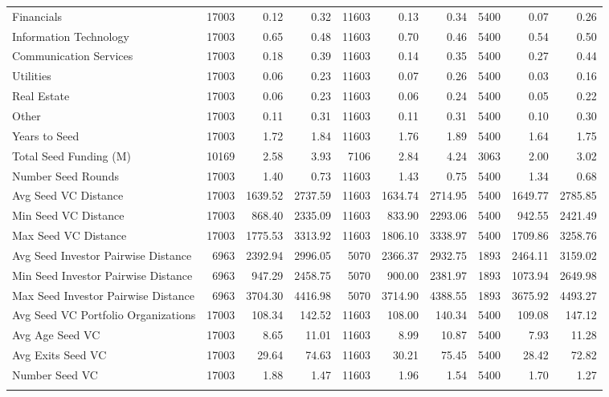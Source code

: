 {\begin{table}[!h]
{\begin{tabular}[t]{lrrrrrrrrr}
Financials & 17003 & 0.12 & 0.32 & 11603 & 0.13 & 0.34 & 5400 & 0.07 & 0.26\\
Information Technology & 17003 & 0.65 & 0.48 & 11603 & 0.70 & 0.46 & 5400 & 0.54 & 0.50\\
Communication Services & 17003 & 0.18 & 0.39 & 11603 & 0.14 & 0.35 & 5400 & 0.27 & 0.44\\
Utilities & 17003 & 0.06 & 0.23 & 11603 & 0.07 & 0.26 & 5400 & 0.03 & 0.16\\
\addlinespace
Real Estate & 17003 & 0.06 & 0.23 & 11603 & 0.06 & 0.24 & 5400 & 0.05 & 0.22\\
Other & 17003 & 0.11 & 0.31 & 11603 & 0.11 & 0.31 & 5400 & 0.10 & 0.30\\
Years to Seed & 17003 & 1.72 & 1.84 & 11603 & 1.76 & 1.89 & 5400 & 1.64 & 1.75\\
Total Seed Funding (M) & 10169 & 2.58 & 3.93 & 7106 & 2.84 & 4.24 & 3063 & 2.00 & 3.02\\
Number Seed Rounds & 17003 & 1.40 & 0.73 & 11603 & 1.43 & 0.75 & 5400 & 1.34 & 0.68\\
\addlinespace
Avg Seed VC Distance & 17003 & 1639.52 & 2737.59 & 11603 & 1634.74 & 2714.95 & 5400 & 1649.77 & 2785.85\\
Min Seed VC Distance & 17003 & 868.40 & 2335.09 & 11603 & 833.90 & 2293.06 & 5400 & 942.55 & 2421.49\\
Max Seed VC Distance & 17003 & 1775.53 & 3313.92 & 11603 & 1806.10 & 3338.97 & 5400 & 1709.86 & 3258.76\\
Avg Seed Investor Pairwise Distance & 6963 & 2392.94 & 2996.05 & 5070 & 2366.37 & 2932.75 & 1893 & 2464.11 & 3159.02\\
Min Seed Investor Pairwise Distance & 6963 & 947.29 & 2458.75 & 5070 & 900.00 & 2381.97 & 1893 & 1073.94 & 2649.98\\
\addlinespace
Max Seed Investor Pairwise Distance & 6963 & 3704.30 & 4416.98 & 5070 & 3714.90 & 4388.55 & 1893 & 3675.92 & 4493.27\\
Avg Seed VC Portfolio Organizations & 17003 & 108.34 & 142.52 & 11603 & 108.00 & 140.34 & 5400 & 109.08 & 147.12\\
Avg Age Seed VC & 17003 & 8.65 & 11.01 & 11603 & 8.99 & 10.87 & 5400 & 7.93 & 11.28\\
Avg Exits Seed VC & 17003 & 29.64 & 74.63 & 11603 & 30.21 & 75.45 & 5400 & 28.42 & 72.82\\
Number Seed VC & 17003 & 1.88 & 1.47 & 11603 & 1.96 & 1.54 & 5400 & 1.70 & 1.27\\
\addlinespace

\end{tabular}}
\end{table}}
